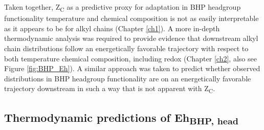 
Taken together, Z\textsubscript{C} as a predictive proxy for adaptation in BHP headgroup functionality temperature and chemical composition is not as easily interpretable as it appears to be for alkyl chains (Chapter \ref{ch1}). A more in-depth thermodynamic analysis was required to provide evidence that downstream alkyl chain distributions follow an energetically favorable trajectory with respect to both temperature chemical composition, including redox (Chapter \ref{ch2}, also see Figure \ref{fig:BHP_Eh}). A similar approach was taken to predict whether observed distributions in BHP headgroup functionality are on an energetically favorable trajectory downstream in such a way that is not apparent with Z\textsubscript{C}.

\subsection{Thermodynamic predictions of Eh\textsubscript{BHP, head}}

